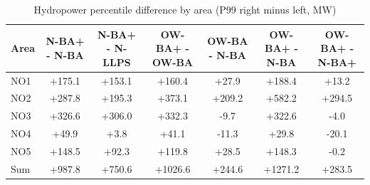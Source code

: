 \begin{table}[htbp]
\centering
\caption{Hydropower percentile difference by area (P99 right minus left, MW)}
\label{tab:hydro_p99_diff_area_pairs}
\begin{tabular}{lcccccc}
\hline
Area & N-BA+ - N-BA & N-BA+ - N-LLPS & OW-BA+ - OW-BA & OW-BA - N-BA & OW-BA+ - N-BA & OW-BA+ - N-BA+ \\
\hline
NO1 & +175.1 & +153.1 & +160.4 & +27.9 & +188.4 & +13.2 \\
NO2 & +287.8 & +195.3 & +373.1 & +209.2 & +582.2 & +294.5 \\
NO3 & +326.6 & +306.0 & +332.3 & -9.7 & +322.6 & -4.0 \\
NO4 & +49.9 & +3.8 & +41.1 & -11.3 & +29.8 & -20.1 \\
NO5 & +148.5 & +92.3 & +119.8 & +28.5 & +148.3 & -0.2 \\
\hline
Sum & +987.8 & +750.6 & +1026.6 & +244.6 & +1271.2 & +283.5 \\
\hline
\end{tabular}
\end{table}